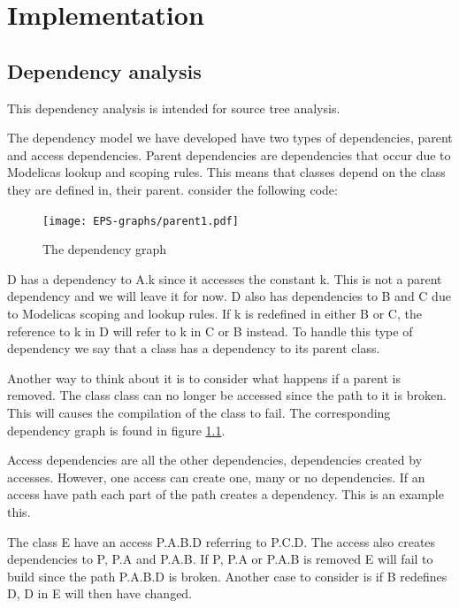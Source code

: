 \documentclass{cslthse-msc}
\begin{document}
\chapter[Implementation]{Implementation}

\section{Dependency analysis}

This dependency analysis is intended for source tree analysis.

The dependency model we have developed have two types of dependencies, parent and access dependencies. Parent dependencies are dependencies that occur due to Modelicas lookup and scoping rules. This means that classes depend on the class they are defined in, their parent. consider the following code:


\begin{figure}
    \centering
    \texttt{[image: EPS-graphs/parent1.pdf]}
  \caption{The dependency graph}
  \label{fig:parent1graph}
\end{figure}

D has a dependency to A.k since it accesses the constant k. This is not a parent dependency and we will leave it for now. D also has dependencies to B and C due to Modelicas scoping and lookup rules. If k is redefined in either B or C, the reference to k in D will refer to k in C or B instead. To handle this type of dependency we say that a class has a dependency to its parent class.

Another way to think about it is to consider what happens if a parent is removed. The class class can no longer be accessed since the path to it is broken. This will causes the compilation of the class to fail. The corresponding dependency graph is found in figure \ref{fig:parent1graph}.

Access dependencies are all the other dependencies, dependencies created by accesses. However, one access can create one, many or no dependencies. If an access have path each part of the path creates a dependency. This is an example this.

The class E have an access P.A.B.D referring to P.C.D. The access also creates dependencies to P, P.A and P.A.B. If P, P.A or P.A.B is removed E will fail to build since the path P.A.B.D is broken. Another case to consider is if B redefines D, D in E will then have changed.
\end{document}
